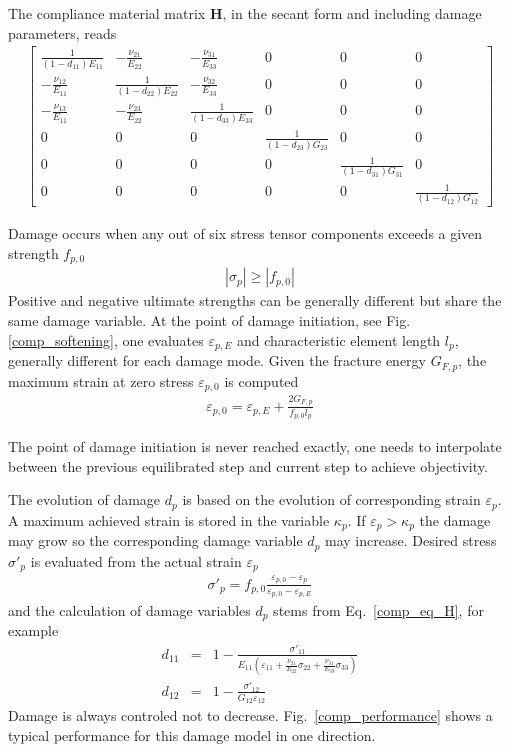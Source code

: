 \documentclass[a4paper]{article}
\begin{document}
The compliance material matrix $\mathbf{H}$, in the secant form and including damage parameters, reads
\footnotesize
\begin{eqnarray}
\left[ \begin{array}{cccccc}
\frac{1}{(1-d_{11})E_{11}} & -\frac{\nu_{21}}{E_{22}} & -\frac{\nu_{31}}{E_{33}} &0 &0 & 0\\
-\frac{\nu_{12}}{E_{11}} & \frac{1}{(1-d_{22})E_{22}} & -\frac{\nu_{32}}{E_{33}} &0& 0&0\\
-\frac{\nu_{13}}{E_{11}} & -\frac{\nu_{23}}{E_{22}} & \frac{1}{(1-d_{33})E_{33}} &0 &0 &0 \\
 0&0 &0 & \frac{1}{(1-d_{23})G_{23}} & 0&0 \\
 0& 0& 0& 0& \frac{1}{(1-d_{31})G_{31}} & 0\\
 0& 0&0 &0& 0& \frac{1}{(1-d_{12})G_{12}}
\end{array} \right]\label{comp_eq_H}
\end{eqnarray}
\normalsize

Damage occurs when any out of six stress tensor components exceeds a given strength $f_{p,0}$
\begin{eqnarray}
|\sigma_p| \geq |f_{p,0}|
\end{eqnarray}
Positive and negative ultimate strengths can be generally different but share the same damage variable.
At the point of damage initiation, see Fig. \ref{comp_softening}, one evaluates $\varepsilon_{p,E}$ and characteristic element length $l_p$, generally different for each damage mode. Given the fracture energy $G_{F,p}$, the maximum strain at zero stress $\varepsilon_{p,0}$ is computed
\begin{eqnarray}
\varepsilon_{p,0} = \varepsilon_{p,E} + \frac{2G_{F,p}}{f_{p,0} l_p}
\end{eqnarray}

The point of damage initiation is never reached exactly, one needs to interpolate between the previous equilibrated step and current step to achieve objectivity.

The evolution of damage $d_p$ is based on the evolution of corresponding strain $\varepsilon_p$. A maximum achieved strain is stored in the variable $\kappa_p$. If $\varepsilon_p > \kappa_p$ the damage may grow so the corresponding damage variable $d_p$ may increase. Desired stress $\sigma'_p$ is evaluated from the actual strain $\varepsilon_p$
\begin{eqnarray}
\sigma'_p = f_{p,0} \frac{\varepsilon_{p,0} - \varepsilon_p}{\varepsilon_{p,0}-\varepsilon_{p,E}}
\end{eqnarray}
and the calculation of damage variables $d_p$ stems from Eq.~\ref{comp_eq_H}, for example
\begin{eqnarray}
d_{11} &=& 1 - \frac{\sigma'_{11}}{E_{11}\left(\varepsilon_{11}+\frac{\nu_{21}}{E_{22}}\sigma_{22}+ \frac{\nu_{31}}{E_{33}}\sigma_{33} \right)}\\
d_{12} &=& 1 - \frac{\sigma'_{12}}{G_{12}\varepsilon_{12}}
\end{eqnarray}
Damage is always controled not to decrease. Fig.~\ref{comp_performance} shows a typical performance for this damage model in one direction.
\end{document}
